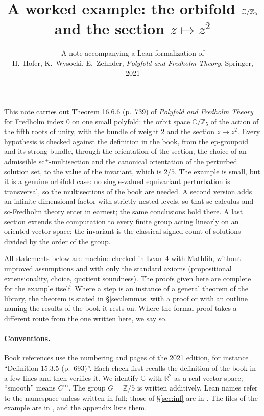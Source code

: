 \documentclass[11pt,a4paper]{article}
\title{A worked example: the orbifold $\C/\Z_5$ and the section $z\mapsto z^2$}
\author{}
\date{A note accompanying a Lean formalization of\\
H.~Hofer, K.~Wysocki, E.~Zehnder, \emph{Polyfold and Fredholm Theory}, Springer, 2021}
\theoremstyle{plain}
\theoremstyle{definition}
\theoremstyle{remark}
\newcommand{\C}{\mathbb{C}}
\newcommand{\R}{\mathbb{R}}
\newcommand{\Z}{\mathbb{Z}}
\newcommand{\ZZ}{\Z/5}
\begin{document}
\maketitle

\noindent
This note carries out Theorem 16.6.6 (p.~739) of \emph{Polyfold and Fredholm Theory} for Fredholm
index $0$ on one small polyfold: the orbit space $\C/\Z_5$ of the action of the fifth roots of unity,
with the bundle of weight $2$ and the section $z\mapsto z^2$. Every hypothesis is checked against the
definition in the book, from the ep-groupoid and its strong bundle, through the orientation of the
section, the choice of an admissible sc$^+$-multisection and the canonical orientation of the perturbed
solution set, to the value of the invariant, which is $2/5$. The example is small, but it is a genuine
orbifold case: no single-valued equivariant perturbation is transversal, so the multisections of the
book are needed. A second version adds an infinite-dimensional factor with strictly nested levels, so
that sc-calculus and sc-Fredholm theory enter in earnest; the same conclusions hold there. A last
section extends the computation to every finite group acting linearly on an oriented vector space: the
invariant is the classical signed count of solutions divided by the order of the group.

All statements below are machine-checked in Lean~4 with Mathlib, without unproved assumptions and
with only the standard axioms (propositional extensionality, choice, quotient soundness). The proofs
given here are complete for the example itself. Where a step is an instance of a general theorem of
the library, the theorem is stated in \S\ref{sec:lemmas} with a proof or with an outline naming the
results of the book it rests on. Where the formal proof takes a different route from the one written
here, we say so.

\paragraph{Conventions.} Book references use the numbering and pages of the 2021 edition, for instance
``Definition 15.3.5 (p.~693)''. Each check first recalls the definition of the book in a few lines and
then verifies it. We identify $\C$ with $\R^2$ as a real vector space; ``smooth'' means $C^\infty$. The
group $G=\ZZ$ is written additively. Lean names refer to the namespace
 unless written in full; those of \S\ref{sec:inf} are in
. The files of the example are in ,
and the appendix lists them.
\end{document}
